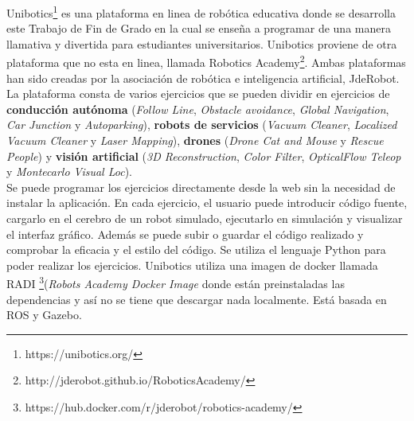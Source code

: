 Unibotics\footnote{https://unibotics.org/} es una plataforma en linea de robótica educativa donde se desarrolla este Trabajo de Fin  de Grado en la cual se enseña a programar de una manera llamativa y divertida para estudiantes universitarios. Unibotics proviene de otra plataforma que no esta en linea, llamada Robotics Academy\footnote{http://jderobot.github.io/RoboticsAcademy/}. Ambas plataformas han sido creadas por la asociación de robótica e  inteligencia artificial, JdeRobot.\\


La plataforma consta de varios ejercicios que se pueden dividir en ejercicios de \textbf{conducción autónoma} (\textit{Follow Line}, \textit{Obstacle avoidance}, \textit{Global Navigation}, \textit{Car Junction} y \textit{Autoparking}), \textbf{robots de servicios }(\textit{Vacuum Cleaner}, \textit{Localized Vacuum Cleaner} y \textit{Laser Mapping}), \textbf{drones} (\textit{Drone Cat and Mouse} y \textit{Rescue People}) y \textbf{visión artificial} (\textit{3D Reconstruction}, \textit{Color Filter}, \textit{OpticalFlow Teleop} y \textit{Montecarlo Visual Loc}).\\

Se puede programar los ejercicios directamente desde la web sin la necesidad de instalar la aplicación. En cada ejercicio, el usuario puede introducir código fuente, cargarlo en el cerebro de un robot simulado, ejecutarlo en simulación y visualizar el interfaz gráﬁco. Además se puede subir o guardar el código realizado y comprobar la eficacia y el estilo del código. Se utiliza el lenguaje Python para poder realizar los ejercicios. Unibotics utiliza una imagen de docker llamada RADI \footnote{https://hub.docker.com/r/jderobot/robotics-academy/}(\textit{Robots Academy Docker Image} donde están preinstaladas las dependencias y así no se tiene que descargar nada localmente. Está basada en ROS y Gazebo\cite{robotics}.\\

